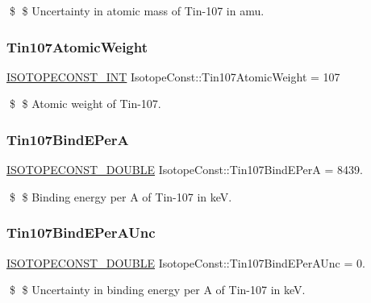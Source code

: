 \$ \$ Uncertainty in atomic mass of Tin-\/107 in amu. \mbox{\label{group___isotope_const-_tin-_sn107_ga5e077f62c49ef4d07555fb650e16436d}} 
\subsubsection{\texorpdfstring{Tin107\+Atomic\+Weight}{Tin107AtomicWeight}}
{\footnotesize\ttfamily \mbox{\hyperlink{group___isotope_const-_macros_ga5f18360b3e99483a35c32d789e62621c}{I\+S\+O\+T\+O\+P\+E\+C\+O\+N\+S\+T\+\_\+\+I\+NT}} Isotope\+Const\+::\+Tin107\+Atomic\+Weight = 107}

\$ \$ Atomic weight of Tin-\/107. \mbox{\label{group___isotope_const-_tin-_sn107_ga9439afc05a4a3c2266bbf01835087cb7}} 
\subsubsection{\texorpdfstring{Tin107\+Bind\+E\+PerA}{Tin107BindEPerA}}
{\footnotesize\ttfamily \mbox{\hyperlink{group___isotope_const-_macros_ga8f45a7272ce02c0b4c65c44636ed719a}{I\+S\+O\+T\+O\+P\+E\+C\+O\+N\+S\+T\+\_\+\+D\+O\+U\+B\+LE}} Isotope\+Const\+::\+Tin107\+Bind\+E\+PerA = 8439.}

\$ \$ Binding energy per A of Tin-\/107 in keV. \mbox{\label{group___isotope_const-_tin-_sn107_ga195b957a65fc63f40b3524390ab2a773}} 
\subsubsection{\texorpdfstring{Tin107\+Bind\+E\+Per\+A\+Unc}{Tin107BindEPerAUnc}}
{\footnotesize\ttfamily \mbox{\hyperlink{group___isotope_const-_macros_ga8f45a7272ce02c0b4c65c44636ed719a}{I\+S\+O\+T\+O\+P\+E\+C\+O\+N\+S\+T\+\_\+\+D\+O\+U\+B\+LE}} Isotope\+Const\+::\+Tin107\+Bind\+E\+Per\+A\+Unc = 0.}

\$ \$ Uncertainty in binding energy per A of Tin-\/107 in keV. \mbox{\label{group___isotope_const-_tin-_sn107_ga5070823e660af11d517923786f6b0800}} 
